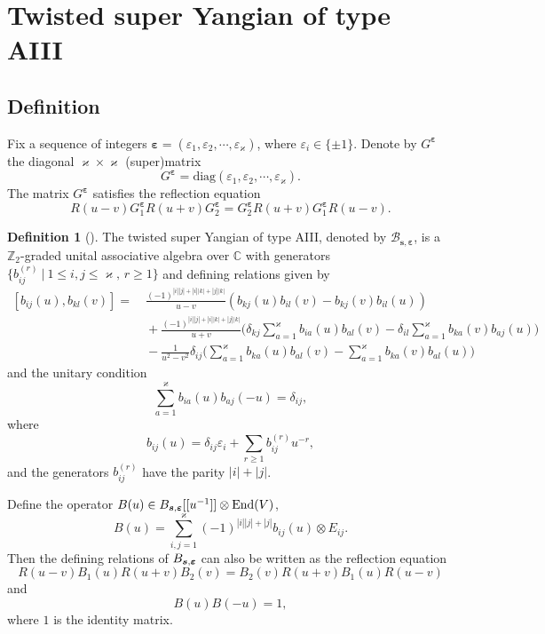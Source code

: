 \documentclass[11pt,reqno]{amsart}
\numberwithin{equation}{section}
\theoremstyle{definition}
\newtheorem{dfn}[thm]{Definition}
\theoremstyle{remark}
\newcommand{\beq}{\begin{equation}}
\newcommand{\eeq}{\end{equation}}
\newcommand{\C}{\mathbb{C}}
\newcommand{\Z}{\mathbb{Z}}
\newcommand{\End}{\mathrm{End}}
\newcommand{\gge}{\geqslant}
\newcommand{\lle}{\leqslant}
\newcommand{\ka}{\varkappa}
\newcommand{\ve}{\varepsilon}
\begin{document}
\section{Twisted super Yangian of type AIII}\label{sec:twisted-super-yangians}
\subsection{Definition}
Fix a sequence of integers $\bm\ve=(\ve_1,\ve_2,\cdots,\ve_\ka)$, where $\ve_i \in\{\pm 1\}$.
 Denote by $G^{\bm\ve}$ the diagonal $\ka\times \ka$ (super)matrix
\beq\label{eq:G}
G^{\bm\ve}=\mathrm{diag}(\ve_1,\ve_2,\cdots,\ve_\ka).
\eeq
The matrix $G^{\bm\ve}$ satisfies the reflection equation
\beq\label{eq:reflectG}
R(u-v)G^{\bm\ve}_1R(u+v)G^{\bm\ve}_2=G^{\bm\ve}_2R(u+v)G^{\bm\ve}_1R(u-v).
\eeq

\begin{dfn}[{\cite{Molev2002reflection,Ragoucy2007analytical,Belliard2009nested}}]
The twisted super Yangian  of type AIII, denoted by $\mathscr B_{\bm s,\bm\ve}$, is a $\Z_2$-graded unital associative algebra over $\C$ with generators $\{b_{ij}^{(r)}\ |\ 1\lle i,j\lle \ka, \, r\gge 1\}$ and defining relations given by
\beq\label{eq:comm-series b}
\begin{split}
[b_{ij}(u),b_{kl}(v)]= & \ \frac{(-1)^{|i||j|+|i||k|+|j||k|}}{u-v}(b_{kj}(u)b_{il}(v)-b_{kj}(v)b_{il}(u))\\
&\ + \frac{(-1)^{|i||j|+|i||k|+|j||k|}}{u+v}\Big(\delta_{kj}\sum_{a=1}^\ka b_{ia}(u)b_{al}(v)-\delta_{il}\sum_{a=1}^\ka b_{ka}(v)b_{aj}(u)\Big)\\
&\ - \frac{1}{u^2-v^2}\delta_{ij}\Big(\sum_{a=1}^\ka b_{ka}(u)b_{al}(v)-\sum_{a=1}^\ka b_{ka}(v)b_{al}(u)\Big)
\end{split}
\eeq
and the unitary condition
\beq\label{eq:unitary-series}
\sum_{a=1}^\ka b_{ia}(u)b_{aj}(-u)=\delta_{ij},
\eeq
where
\[
b_{ij}(u)=\delta_{ij}\ve_i+\sum_{r\gge 1} b_{ij}^{(r)}u^{-r},
\]
and the generators $b_{ij}^{(r)}$ have the parity $|i|+|j|$.
\end{dfn}
Define the operator $B(u)\in \mathcal \mathscr B_{\bm s,\bm\ve}[[u^{-1}]] \otimes\End(V)$,
\beq\label{eq matrix notation b}
B(u)=\sum_{i,j=1}^\ka (-1)^{|i||j|+|j|} b_{ij}(u)\otimes E_{ij}.
\eeq
Then the defining relations of $\mathcal \mathscr B_{\bm s,\bm\ve}$ can also be written as the reflection equation
\beq\label{eq:comm-generators b}
R(u-v)B_1(u)R(u+v)B_2(v)=B_2(v)R(u+v)B_1(u)R(u-v)
\eeq
and
\beq\label{eq:unitary}
B(u)B(-u)=1,
\eeq
where $1$ is the identity matrix.
\end{document}

